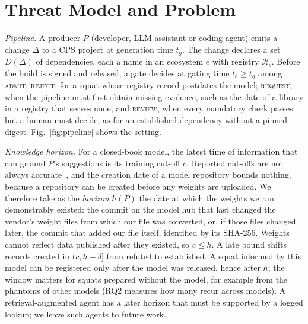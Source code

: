 \documentclass[conference]{IEEEtran}
\newcommand{\dec}[1]{\textsc{#1}}
\newcommand{\Reg}{\mathcal{R}}
\begin{document}
\section{Threat Model and Problem}
\label{sec:threat}

\emph{Pipeline.} A producer $P$ (developer, LLM assistant or coding agent) emits a change $\Delta$ to a CPS project at
generation time $t_g$. The change declares a set $D(\Delta)$ of dependencies, each a name in an ecosystem $e$ with
registry $\Reg_e$. Before the build is signed and released, a gate decides at gating time $t_b\ge t_g$ among
\dec{admit}; \dec{reject}, for a squat whose registry record postdates the model; \dec{request}, when the pipeline
must first obtain missing evidence, such as the date of a library in a registry that serves none; and \dec{review},
when every mandatory check passes but a human must decide, as for an established dependency without a pinned digest.
Fig.~\ref{fig:pipeline} shows the setting.

\emph{Knowledge horizon.} For a closed-book model, the latest time of information that can ground $P$'s suggestions is
its training cut-off $c$. Reported cut-offs are not always accurate~\cite{cheng2024dated}, and the creation date of a
model repository bounds nothing, because a repository can be created before any weights are uploaded. We therefore
take as the \emph{horizon} $h(P)$ the date at which the weights we ran demonstrably existed: the commit on the model hub
that last changed the vendor's weight files from which our file was converted, or, if those files changed later, the
commit that added our file itself, identified by its SHA-256. Weights cannot reflect data published after they
existed, so $c\le h$. A late bound shifts records created in $(c,h-\delta]$ from refuted to established. A squat
informed by this model can be registered only after the model was released, hence after $h$; the window matters for
squats prepared without the model, for example from the phantoms of other models (RQ2 measures how many recur across
models). A retrieval-augmented agent has a later horizon that must be supported by a logged lookup; we leave such
agents to future work.
\end{document}
